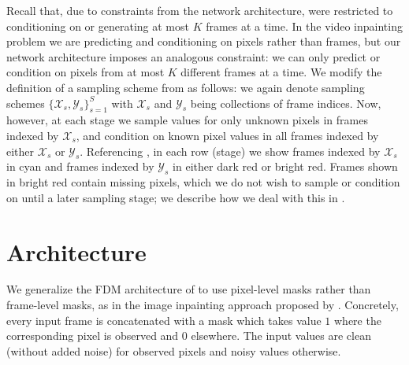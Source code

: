 Recall that, due to constraints from the network architecture, \citet{fdm} were restricted to conditioning on or generating at most $K$ frames at a time. In the video inpainting problem we are predicting and conditioning on pixels rather than frames, but our network architecture imposes an analogous constraint: we can only predict or condition on pixels from at most $K$ different frames at a time. We modify the definition of a sampling scheme from \citet{fdm} as follows: we again denote sampling schemes $\{\mathcal{X}_s, \mathcal{Y}_s\}_{s=1}^S$ with $\mathcal{X}_s$ and $\mathcal{Y}_s$ being collections of frame indices. Now, however, at each stage we sample values for only unknown pixels in frames indexed by $\mathcal{X}_s$, and condition on known pixel values in all frames indexed by either $\mathcal{X}_s$ or $\mathcal{Y}_s$. Referencing , in each row (stage) we show frames indexed by $\mathcal{X}_s$ in \textcolor{latentcolor}{cyan} and frames indexed by $\mathcal{Y}_s$ in either \textcolor{observedpastcolor}{dark red} or \textcolor{observedfuturecolor}{bright red}. Frames shown in \textcolor{observedfuturecolor}{bright red} contain missing pixels, which we do not wish to sample or condition on until a later sampling stage; we describe how we deal with this in .


\section{Architecture}
We generalize the FDM architecture of \citet{fdm} to use pixel-level masks rather than frame-level masks, as in the image inpainting approach proposed by \citet{palette}. Concretely, every input frame is concatenated with a mask which takes value $1$ where the corresponding pixel is observed and $0$ elsewhere. The input values are clean (without added noise) for observed pixels and noisy values otherwise.



